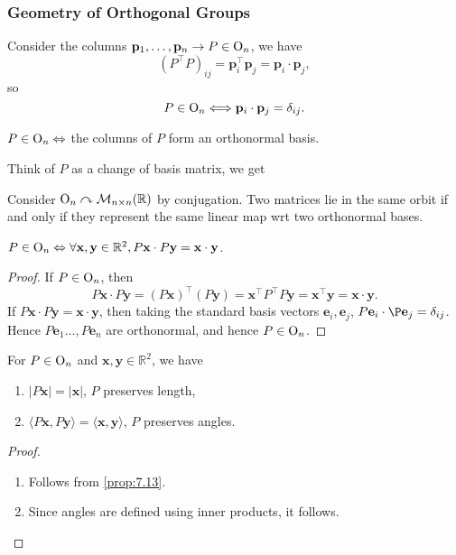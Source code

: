 \documentclass[a4paper]{article}
\begin{document}
\subsubsection{Geometry of Orthogonal Groups}
Consider the columns $ \mathbf{p}_1,\dots,\mathbf{p}_n\to P\in \mathrm{O}_n $, we have
\[
  (P^\top P)_{ij} = \mathbf{p}_i^\top\mathbf{p}_j = \mathbf{p}_i
  \cdot \mathbf{p}_j,
\]
so
\[
  P\in \mathrm{O}_n \Longleftrightarrow \mathbf{p}_i \cdot \mathbf{p}_j = \delta_{ij}.
\]
\begin{proposition}\label{prop:7.11}
  $ P\in \mathrm{O}_n \Leftrightarrow  $ the columns of $P$ form an orthonormal basis.
\end{proposition}
Think of $P$ as a change of basis matrix, we get
\begin{proposition}\label{prop:7.12}
  Consider $ \mathrm{O}_n \curvearrowright \mathcal{M}_{n\times
  n}(\mathbb{R}) $ by conjugation. Two matrices lie in the same orbit
  if and only if they represent the same linear map wrt two orthonormal bases.
\end{proposition}
\begin{proposition}\label{prop:7.13}
  $ P\in \mathrm{O}_n \Leftrightarrow \forall \mathbf{x},\mathbf{y}\in
  \mathbb{R}^{2}, P\mathbf{x} \cdot P\mathbf{y} = \mathbf{x} \cdot \mathbf{y} $.
\end{proposition}
\begin{proof}
  If $ P\in \mathrm{O}_n $, then
  \[
    P\mathbf{x} \cdot P\mathbf{y} = (P\mathbf{x})^\top(P\mathbf{y}) =
    \mathbf{x}^\top P^\top P \mathbf{y} = \mathbf{x}^\top \mathbf{y}
    = \mathbf{x} \cdot \mathbf{y}.
  \]
  If $P\mathbf{x} \cdot P\mathbf{y} = \mathbf{x} \cdot \mathbf{y}$,
  then taking the standard basis vectors $\mathbf{e}_i,\mathbf{e}_j$,
  $ P\mathbf{e}_i \cdot \P\mathbf{e}_j = \delta_{ij} $. Hence $
  P\mathbf{e}_1 \dots, P\mathbf{e}_n $ are orthonormal, and hence $P\in \mathrm{O}_n$.
\end{proof}
\begin{corollary}\label{col:7.13}
  For $P\in \mathrm{O}_n$ and $ \mathbf{x},\mathbf{y}\in \mathbb{R}^{2} $, we have
  \begin{enumerate}
    \item $ |P\mathbf{x}|=|\mathbf{x}| $, $P$ preserves length,
    \item $ \langle P\mathbf{x},P\mathbf{y} \rangle = \langle
      \mathbf{x},\mathbf{y} \rangle $, $P$ preserves angles.
  \end{enumerate}
\end{corollary}
\begin{proof}
  \begin{enumerate}
    \item Follows from \ref{prop:7.13}.
    \item Since angles are defined using inner products, it follows.
  \end{enumerate}
\end{proof}
\end{document}
